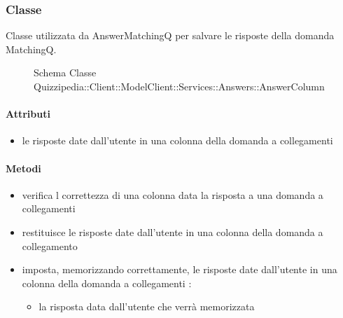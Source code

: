 \subsubsection{Classe }
Classe utilizzata da AnswerMatchingQ per salvare le risposte della domanda MatchingQ.
\begin{figure}[H]
\centering
\noindent{}
\caption[Schema Classe AnswerColumn]{Schema Classe Quizzipedia::Client::ModelClient::Services::Answers::AnswerColumn}
\end{figure}
\paragraph{Attributi}
\begin{itemize}
\item {}
\newline
le risposte date dall'utente in una colonna della domanda a collegamenti
\end{itemize}
\paragraph{Metodi}
\begin{itemize}
\item {}
\newline
verifica l correttezza di una colonna data la risposta a una domanda a collegamenti
\newline
\item {}
\newline
restituisce le risposte date dall'utente in una colonna della domanda a collegamento
\newline
\item {}
\newline
imposta, memorizzando correttamente, le risposte date dall'utente in una colonna della domanda a collegamenti
\newline
{} :
\begin{itemize}
\item {}
\newline
la risposta data dall'utente che verrà memorizzata
\end{itemize}
\end{itemize}
